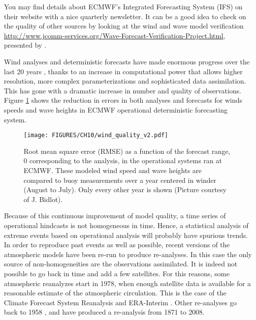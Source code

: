 You may find details about ECMWF's Integrated Forecasting System (IFS) on their website with a nice quarterly newsletter. 
It can be a good idea to check on the quality of other sources by looking at the wind and wave model verification 
\href{http://www.jcomm-services.org/Wave-Forecast-Verification-Project.html}{\small{http://www.jcomm-services.org/Wave-Forecast-Verification-Project.html}}, 
presented by \cite{Bidlot2008}.

Wind analyses and deterministic forecasts have made enormous progress over the last 20 years \citep[e.g.][]{Janssen2008a}, 
thanks to an increase in computational power that allows higher resolution, more complex parameterizations and 
sophisticated data assimilation. This has gone with a dramatic increase in number and quality of observations. 
Figure \ref{fig_wind_quality} shows the reduction in errors in both analyses and forecasts for winds speeds and wave heights in ECMWF 
operational deterministic forecasting system. 
\begin{figure}
\centerline{\texttt{[image: FIGURES/CH10/wind\_quality\_v2.pdf]}}
\caption{Root mean square error (RMSE) as a function of the forecast range, 0 corresponding to the analysis, in the operational systems ran 
at ECMWF. These modeled wind speed and wave heights are compared to buoy measurements over a year centered in winder 
(August to July). Only every other year is shown (Picture courtesy of J. Bidlot).}
\label{fig_wind_quality}
\end{figure}

Because of this continuous improvement of model quality, a time series of operational hindcasts is not homogeneous in time. Hence, 
a statistical analysis of extreme events based on operational analysis will probably have spurious trends. In order to reproduce 
past events as well as possible, recent versions of the atmospheric models have been re-run to produce re-analyses. In this case 
the only source of non-homogeneities are the observations assimilated. It is indeed not possible to go back in time and add a few satellites. 
For this reasons, some atmospheric reanalyzes start in 1978, when enough satellite data is available for a reasonable estimate of the 
atmospheric circulation. This is the case of the Climate Forecast System Reanalysis  \citep[CFSR][]{Saha&al.2010} 
and ERA-Interim \citep{Dee&al.2011}. Other re-analyses go back to 1958 \citep{Kobayashi&al.2015}, and \cite{Compo&al.2011}
 have produced a re-analysis from 1871 to 2008.
 
